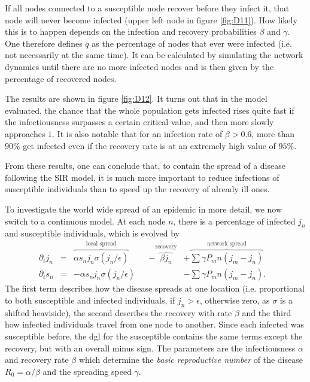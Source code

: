 \documentclass{scrartcl}
\begin{document}
If all nodes connected to a susceptible node recover before they infect it, that node will never become infected (upper left node in figure \ref{fig:D11}). How likely this is to happen depends on the infection and recovery probabilities $\beta$ and $\gamma$. 
One therefore defines $q$ as the percentage of nodes that ever were infected (i.e. not necessarily at the same time). 
It can be calculated by simulating the network dynamics until there are no more infected nodes and is then given by the percentage of recovered nodes. 

The results are shown in figure \ref{fig:D12}. 
It turns out that in the model evaluated, the chance that the whole 
population gets infected rises quite fast if the infectiousness surpasses
a certain critical value, and then more slowly approaches $1$. It is also 
notable that for an infection rate of $\beta > 0.6$, more than $90\%$ get infected even if
the recovery rate is at an extremely high value of $95\%$.

From these results, one can conclude that, to contain the spread of a disease following the SIR model, 
it is much more important to reduce infections of susceptible individuals than to speed up the recovery of already ill ones.

To investigate the world wide spread of an epidemic in more detail, we now switch to a continuous model. At each node $n$, there is a percentage of infected $j_n$ and susceptible individuals, which is evolved by
\begin{align}
\partial_t j_n &=& \overbrace{\alpha s_n j_n \sigma( j_n / \epsilon)}^{\text{local spread}} &&- \overbrace{\beta j_n}^{\text{recovery}} &+ \overbrace{\sum{\gamma P_mn (j_m - j_n)}}^{\text{network spread}}&\\
\partial_t s_n &=& -\alpha s_n j_n \sigma( j_n / \epsilon)&  &&- \sum{\gamma P_mn (j_m - j_n)}.&
\end{align}
The first term describes how the disease spreads at one location (i.e. proportional to both susceptible and infected individuals, if $j_n > \epsilon$, otherwise zero, as $\sigma$ is a shifted heaviside), the second describes the recovery with rate $\beta$ and the third how infected individuals travel from one node to another. Since each infected was susceptible before, the dgl for the susceptible contains the same terms except the recovery, but with an overall minus sign. The parameters are the infectiousness $\alpha$ and recovery rate $\beta$ which determine the \emph{basic reproductive number} of the disease $R_0= \alpha / \beta$ and the spreading speed $\gamma$. 
\end{document}
